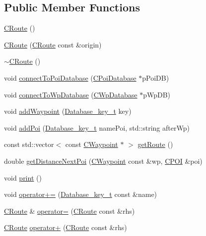 \subsection*{Public Member Functions}
\begin{DoxyCompactItemize}
\item 
\hyperlink{classCRoute_a279642bf28bce1bb9865317db93bb08b}{C\+Route} ()
\item 
\hyperlink{classCRoute_a0f6fad7298482d4717380ec91a5d0bf9}{C\+Route} (\hyperlink{classCRoute}{C\+Route} const \&origin)
\item 
\hyperlink{classCRoute_ac78e6d6f34788ee62f5d65b182cf1c2f}{$\sim$\+C\+Route} ()
\item 
void \hyperlink{classCRoute_a04173f3a28fb020f0704a0703956836f}{connect\+To\+Poi\+Database} (\hyperlink{classCPoiDatabase}{C\+Poi\+Database} $\ast$p\+Poi\+DB)
\item 
void \hyperlink{classCRoute_a0efb25d5f4c3167b189c03cbcd3d64f9}{connect\+To\+Wp\+Database} (\hyperlink{classCWpDatabase}{C\+Wp\+Database} $\ast$p\+Wp\+DB)
\item 
void \hyperlink{classCRoute_ade32420c69c3b4bb2e6068619607f279}{add\+Waypoint} (\hyperlink{CRoute_8h_a112678f2c32c39b2d50c558d89dbde68}{Database\+\_\+key\+\_\+t} key)
\item 
void \hyperlink{classCRoute_ab925dec9a729fbcad96f85065df36b61}{add\+Poi} (\hyperlink{CRoute_8h_a112678f2c32c39b2d50c558d89dbde68}{Database\+\_\+key\+\_\+t} name\+Poi, std\+::string after\+Wp)
\item 
const std\+::vector$<$ const \hyperlink{classCWaypoint}{C\+Waypoint} $\ast$ $>$ \hyperlink{classCRoute_a4e359e364950dc60f1669ff36761e716}{get\+Route} ()
\item 
double \hyperlink{classCRoute_ac0eb87d7cce83cee166de71857fa68cb}{get\+Distance\+Next\+Poi} (\hyperlink{classCWaypoint}{C\+Waypoint} const \&wp, \hyperlink{classCPOI}{C\+P\+OI} \&poi)
\item 
void \hyperlink{classCRoute_ac414ab61fe61cf703eb6225b25d9f09c}{print} ()
\item 
void \hyperlink{classCRoute_a278402d6f68b924679c555a933b6312c}{operator+=} (\hyperlink{CRoute_8h_a112678f2c32c39b2d50c558d89dbde68}{Database\+\_\+key\+\_\+t} const \&name)
\item 
\hyperlink{classCRoute}{C\+Route} \& \hyperlink{classCRoute_a898a4b296423fe629a771de487aae7fc}{operator=} (\hyperlink{classCRoute}{C\+Route} const \&rhs)
\item 
\hyperlink{classCRoute}{C\+Route} \hyperlink{classCRoute_aa9d2cdf6f3a0ce51ca4ab0c4285004a9}{operator+} (\hyperlink{classCRoute}{C\+Route} const \&rhs)
\end{DoxyCompactItemize}


